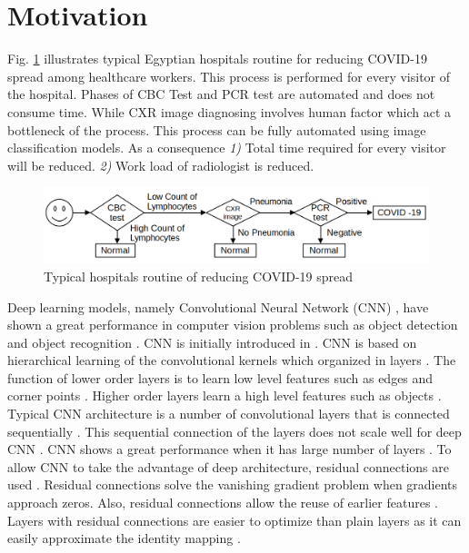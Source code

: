 \section{Motivation}
Fig. \ref{hospitalRoutine} illustrates typical Egyptian hospitals routine for reducing COVID-19 spread among healthcare workers. This process is performed for every visitor of the hospital. Phases of CBC Test and PCR test are automated and does not consume time. While CXR image diagnosing involves human factor which act a bottleneck of the process. This process can be fully automated using image classification models. As a consequence \textit{1)} Total time required for every visitor will be reduced. \textit{2)} Work load of radiologist is reduced. 

\begin{figure}%
    \centering
        \includegraphics[width=\textwidth]{Figures/HosPitalCovidRoutine.png}
        \caption{Typical hospitals routine of reducing COVID-19 spread}
        \label{hospitalRoutine}
\end{figure}

Deep learning \cite{lecun2015deep} models, namely Convolutional Neural Network (CNN) \cite{lecun1989handwritten}, have shown a great performance in computer vision problems such as object detection \cite{erhan2014scalable}\cite{girshick2014rich}\cite{sermanet2013overfeat}\cite{redmon2016you} and object recognition \cite{simonyan2014very}\cite{he2016deep}. CNN is initially introduced in \cite{lecun1989handwritten}. CNN  is based on hierarchical learning of the convolutional kernels which organized in  layers \cite{krizhevsky2012imagenet}. The function of lower order layers is to learn low level features such as edges and corner points \cite{zeiler2014visualizing}. Higher order layers learn a high level features such as objects \cite{zeiler2014visualizing}. Typical CNN architecture is a number of convolutional layers that is connected sequentially \cite{simonyan2014very}. This sequential connection of the layers does not scale well for deep CNN \cite{he2016deep}. CNN shows a great performance when it has large number of layers \cite{he2016deep}. To allow CNN to take the advantage of deep architecture, residual connections are used \cite{he2016deep}. Residual connections solve the vanishing gradient problem when gradients approach zeros. Also, residual connections allow the reuse of earlier features \cite{huang2017densely}. Layers with  residual connections are easier to optimize than plain layers as it can easily approximate the identity mapping \cite{he2016deep}. 